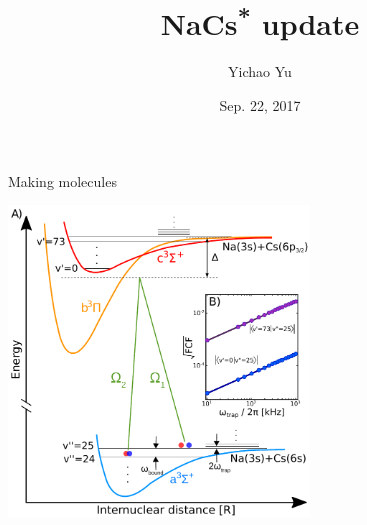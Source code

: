 \documentclass{beamer}
\title{NaCs\textsuperscript{\textbf{*}} update}
\date{Sep. 22, 2017}
\author{Yichao Yu}
\institute{Ni Group/Harvard}
\begin{document}


\begin{frame}{}
  \titlepage
\end{frame}


\begin{frame}{Making molecules}
  \begin{center}
    \includegraphics[width=8cm]{../qual/imgs/molecule-formation.pdf}
  \end{center}
\end{frame}
\end{document}
